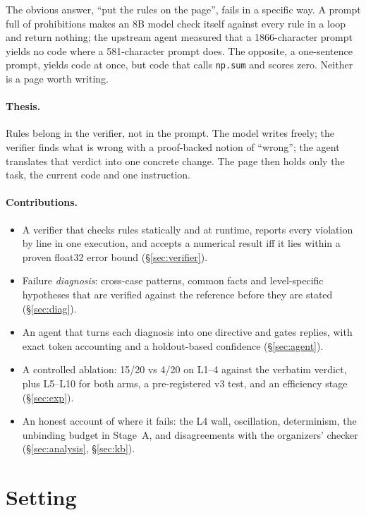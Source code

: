 \documentclass[11pt]{article}
\newcommand{\code}[1]{\texttt{#1}}
\begin{document}
The obvious answer, ``put the rules on the page'', fails in a specific way. A prompt full of
prohibitions makes an 8B model check itself against every rule in a loop and return nothing; the
upstream agent measured that a 1866-character prompt yields no code where a 581-character prompt
does. The opposite, a one-sentence prompt, yields code at once, but code that calls \code{np.sum} and
scores zero. Neither is a page worth writing.

\paragraph{Thesis.} Rules belong in the verifier, not in the prompt. The model writes freely; the
verifier finds what is wrong with a proof-backed notion of ``wrong''; the agent translates that verdict
into one concrete change. The page then holds only the task, the current code and one instruction.

\paragraph{Contributions.}
\begin{itemize}
  \item A verifier that checks rules statically and at runtime, reports every violation by line in one
        execution, and accepts a numerical result iff it lies within a proven float32 error bound
        (\S\ref{sec:verifier}).
  \item Failure \emph{diagnosis}: cross-case patterns, common facts and level-specific hypotheses that
        are verified against the reference before they are stated (\S\ref{sec:diag}).
  \item An agent that turns each diagnosis into one directive and gates replies, with exact token
        accounting and a holdout-based confidence (\S\ref{sec:agent}).
  \item A controlled ablation: 15/20 vs 4/20 on L1--4 against the verbatim verdict, plus L5--L10 for
        both arms, a pre-registered v3 test, and an efficiency stage (\S\ref{sec:exp}).
  \item An honest account of where it fails: the L4 wall, oscillation, determinism, the unbinding
        budget in Stage~A, and disagreements with the organizers' checker (\S\ref{sec:analysis},
        \S\ref{sec:kb}).
\end{itemize}

\section{Setting}
\label{sec:setting}
\end{document}

